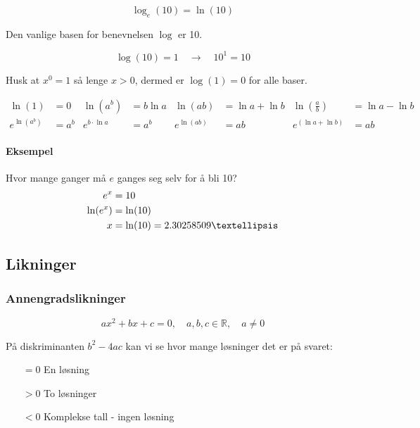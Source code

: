 \documentclass[12pt,norsk,a4paper]{article}
\begin{document}
\begin{equation}
\log_e (10) = \ln (10)
\end{equation}

Den vanlige basen for benevnelsen $\log$ er 10.

\begin{equation}
\log(10) = 1	\quad	\rightarrow	\quad	10^{1} = 10
\end{equation}

Husk at $x^0 = 1$ så lenge $x > 0$, dermed er $\log (1) = 0$ for alle baser.

\begin{align*}
\ln(1)&= 0	&	\ln (a^{b}) &= b \ln a		&	\ln (ab) &= \ln a + \ln b	&	\ln (\frac{a}{b}) &= \ln a - \ln b		\\
e^{\ln (a^{b})} &= a^{b}	&	e^{b \cdot \ln a} &= a^{b}	&	e^{\ln (ab)} &= ab		&	e^{(\ln a + \ln b)} &= ab
\end{align*}

\paragraph*{Eksempel} Hvor mange ganger må $e$ ganges seg selv for å bli 10?
\begin{align*}
e^{x} &= 10				\\
\ln (e^{x}) &= \ln (10)	\\
x &= \ln (10) = 2.30258509 \textellipsis
\end{align*}

\newpage









\subsection{Likninger}
\subsubsection{Annengradslikninger}
\begin{equation}
ax^{2} + bx + c = 0 , \quad a,b,c \in \mathbb{R} , \quad a \neq 0
\end{equation}

På diskriminanten $b^{2} - 4ac$ kan vi se hvor mange løsninger det er på svaret:

\begin{itemize}
\item[$= 0$]En løsning
\item[$> 0$]To løsninger
\item[$< 0$]Komplekse tall - ingen løsning\\
\end{itemize}
\end{document}
